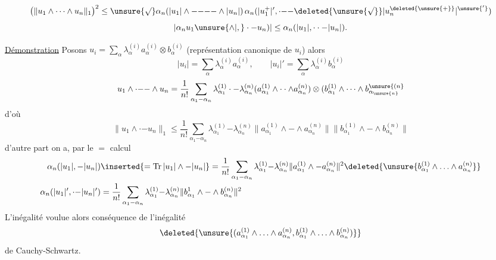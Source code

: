 \[
\bigl(\|u_1\wedge\cdots\wedge u_n\|_1\bigr)^2\leq
\unsure{\surd}\alpha_n(|u_1|\wedge\mathord{-}\mathord{-}\mathord{-}\mathord{-}\wedge|u_n|)
\,\alpha_n(|u_1^+|',\cdot\mathord{-}\mathord{-}
\deleted{\unsure{\sqrt{\vphantom{u}}}}|u_n^{\deleted{\unsure{+}}}|^{\unsure{'}})
\]
\[
|\alpha_n u_1\unsure{\wedge|,}\cdot\mathord{-}u_n)|
\leq\alpha_n(|u_1|,\cdot\cdot\mathord{-}|u_n|).
\]
\begin{flushright}
\end{flushright}

\uline{Démonstration} \quad Posons $u_i=\sum_\alpha\lambda_\alpha^{(i)}a_\alpha^{(i)}\otimes b_\alpha^{(i)}$
(représentation canonique de $u_i$) alors
\[
|u_i|=\sum_\alpha\lambda_\alpha^{(i)}a_\alpha^{(i)},\qquad
|u_i|'=\sum_\alpha\lambda_\alpha^{(i)}b_\alpha^{(i)}
\]
\[
u_1\wedge\cdot\mathord{-}\mathord{-}\wedge u_n
=\frac{1}{n!}\sum_{\alpha_1\mathord{-}\alpha_n}
\lambda_{\alpha_1}^{(1)}\cdot\mathord{-}\lambda_{\alpha_n}^{(n)}
(a_{\alpha_1}^{(1)}\wedge\cdot\cdot\wedge a_{\alpha_n}^{(n)})
\otimes(b_{\alpha_1}^{(1)}\wedge\cdots\wedge b_{\alpha_{\unsure{n}}}^{\unsure{(n}}
\]
d'où
\[
\|u_1\wedge\cdot\mathord{-}u_n\|_1\leq\frac{1}{n!}\sum_{\alpha_1\mathord{-}\alpha_n}
\lambda_{\alpha_1}^{(1)}\mathord{-}\lambda_{\alpha_n}^{(n)}
\|a_{\alpha_1}^{(1)}\wedge\mathord{-}\wedge a_{\alpha_n}^{(n)}\|
\|b_{\alpha_1}^{(1)}\wedge\mathord{-}\wedge b_{\alpha_n}^{(n)}\|
\]
d'autre part on a, par le $=$ calcul
\[
\begin{aligned}
\alpha_n(|u_1|,\mathord{-}|u_n|)&\inserted{=\operatorname{Tr}|u_1|\wedge\mathord{-}|u_n|}=
\frac{1}{n!}\sum_{\alpha_1\mathord{-}\alpha_n}\lambda_{\alpha_1}^{(1)}\mathord{-}\lambda_{\alpha_n}^{(n)}
\|a_{\alpha_1}^{(1)}\wedge\mathord{-}a_{\alpha_n}^{(n)}\|^2
\deleted{\unsure{b_{\alpha_1}^{(1)}\wedge\ldots\wedge a_{\alpha_n}^{(n)}}}\\
\alpha_n(|u_1|',\cdot\mathord{-}|u_n|')&=\frac{1}{n!}\sum_{\alpha_1\mathord{-}\alpha_n}
\lambda_{\alpha_1}^{(1)}\mathord{-}\lambda_{\alpha_n}^{(n)}
\|b_{\alpha_1}^{1}\wedge\mathord{-}\wedge b_{\alpha_n}^{(n)}\|^2
\end{aligned}
\]
L'inégalité voulue   alors conséquence de l'inégalité
\[
\deleted{\unsure{(a_{\alpha_1}^{(1)}\wedge\ldots\wedge a_{\alpha_n}^{(n)},b_{\alpha_1}^{(1)}\wedge\ldots\wedge b_{\alpha_n}^{(n)})}}
\]
de Cauchy-Schwartz.

